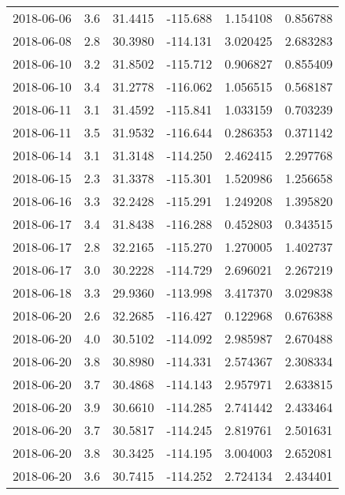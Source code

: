 \begin{tabular}{lrrrrr}
2018-06-06 &       3.6 &  31.4415 &  -115.688 &         1.154108 &         0.856788 \\
2018-06-08 &       2.8 &  30.3980 &  -114.131 &         3.020425 &         2.683283 \\
2018-06-10 &       3.2 &  31.8502 &  -115.712 &         0.906827 &         0.855409 \\
2018-06-10 &       3.4 &  31.2778 &  -116.062 &         1.056515 &         0.568187 \\
2018-06-11 &       3.1 &  31.4592 &  -115.841 &         1.033159 &         0.703239 \\
2018-06-11 &       3.5 &  31.9532 &  -116.644 &         0.286353 &         0.371142 \\
2018-06-14 &       3.1 &  31.3148 &  -114.250 &         2.462415 &         2.297768 \\
2018-06-15 &       2.3 &  31.3378 &  -115.301 &         1.520986 &         1.256658 \\
2018-06-16 &       3.3 &  32.2428 &  -115.291 &         1.249208 &         1.395820 \\
2018-06-17 &       3.4 &  31.8438 &  -116.288 &         0.452803 &         0.343515 \\
2018-06-17 &       2.8 &  32.2165 &  -115.270 &         1.270005 &         1.402737 \\
2018-06-17 &       3.0 &  30.2228 &  -114.729 &         2.696021 &         2.267219 \\
2018-06-18 &       3.3 &  29.9360 &  -113.998 &         3.417370 &         3.029838 \\
2018-06-20 &       2.6 &  32.2685 &  -116.427 &         0.122968 &         0.676388 \\
2018-06-20 &       4.0 &  30.5102 &  -114.092 &         2.985987 &         2.670488 \\
2018-06-20 &       3.8 &  30.8980 &  -114.331 &         2.574367 &         2.308334 \\
2018-06-20 &       3.7 &  30.4868 &  -114.143 &         2.957971 &         2.633815 \\
2018-06-20 &       3.9 &  30.6610 &  -114.285 &         2.741442 &         2.433464 \\
2018-06-20 &       3.7 &  30.5817 &  -114.245 &         2.819761 &         2.501631 \\
2018-06-20 &       3.8 &  30.3425 &  -114.195 &         3.004003 &         2.652081 \\
2018-06-20 &       3.6 &  30.7415 &  -114.252 &         2.724134 &         2.434401 \\

\end{tabular}
